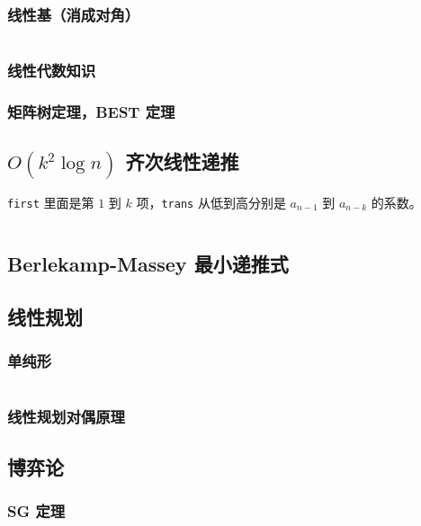 \documentclass[a4paper, twoside]{article}
\begin{document}
\begin{multicols}{2}
				\subsubsection{线性基（消成对角）}
					\inputminted{cpp}{../src/math/线性基.cpp}

				\subsubsection{线性代数知识}
					
				
				\subsubsection{矩阵树定理，BEST 定理}
					
			
			\subsection{$O(k^2 \log n)$ 齐次线性递推}
				\texttt{first} 里面是第 $1$ 到 $k$ 项，\texttt{trans} 从低到高分别是 $a_{n - 1}$ 到 $a_{n - k}$ 的系数。
				
				\inputminted{cpp}{../src/math/齐次线性递推.cpp}
			
			\subsection{Berlekamp-Massey 最小递推式}
				

			\subsection{线性规划}
				\subsubsection[单纯形 Simplex]{单纯形}
					\inputminted{cpp}{../src/math/单纯形.cpp}

				\subsubsection{线性规划对偶原理}
					
			
			\subsection{博弈论}
				\subsubsection{SG 定理}
					


\end{multicols}
\end{document}
